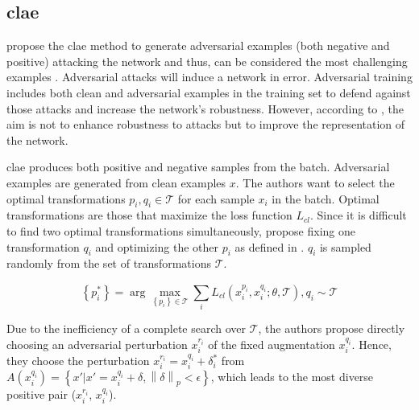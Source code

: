 \subsection{\acl{clae}}\label{subsec:adversarial_examples}


\citeauthor{adversarial_2020} propose the \ac{clae} method to generate adversarial examples 
(both negative and positive) attacking the network and thus,
can be considered the most challenging examples \cite{adversarial_2020}.
Adversarial attacks will induce a network in error.
Adversarial training includes both clean and adversarial examples in the training set to defend against those attacks and 
increase the network's robustness.
However, according to \citeauthor{adversarial_2020}, the aim is not to enhance robustness to attacks 
but to improve the representation of the network.

\ac{clae} produces both positive and negative samples from the batch.
Adversarial examples are generated from clean examples $x$.
The authors want to select the optimal transformations $p_i, q_i \in \mathcal{T}$ for each sample $x_i$ in the batch.
Optimal transformations are those that maximize the loss function $L_{cl}$.
Since it is difficult to find two optimal transformations simultaneously, 
\citeauthor{adversarial_2020} propose fixing one transformation $q_i$ and 
optimizing the other $p_i$ as defined in .
$q_i$ is sampled randomly from the set of transformations $\mathcal{T}$.

\begin{equation}
    \left\{p^*_i\right\} = \arg\max_{\left\{p_i\right\} \in \mathcal{T}} \sum_{i}^{}L_{cl}(x_i^{p_i}, x_i^{q_i}; \theta, \mathcal{T}), q_i \sim \mathcal{T}
    \label{eq:clae_optimal_transformations}
\end{equation}

Due to the inefficiency of a complete search over $\mathcal{T}$, 
the authors propose directly choosing an adversarial perturbation $x^{r_i}_i$ of the fixed augmentation $x_i^{q_i}$.
Hence, they choose the perturbation $x^{r_i}_i = x^{q_i}_i + \delta^*_i$ from 
$A(x^{q_i}_i) = \left\{x' | x' = x^{q_i}_i + \delta, \left\|\delta\right\|_p < \epsilon\right\}$,
which leads to the most diverse positive pair ($x^{r_i}_i$, $x^{q_i}_i$).

